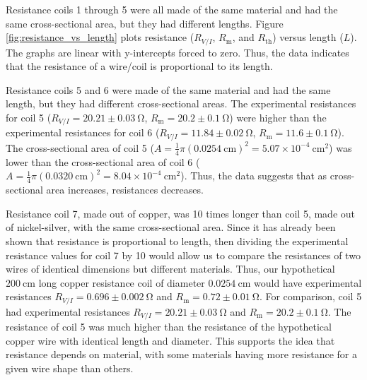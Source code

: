 \documentclass[12pt]{iopart} %
\gdef\sci#1#2{#1 \times 10^{#2}}
\gdef\units#1{~\mathrm{#1}}
\begin{document}
Resistance coils 1 through 5 were all made of the same material and had the same cross-sectional area, but they had different lengths.
Figure \ref{fig:resistance_vs_length} plots resistance ($R_{V/I}$, $R_\mathrm{m}$, and $R_\mathrm{th}$) versus length ($L$).
The graphs are linear with y-intercepts forced to zero.
Thus, the data indicates that the resistance of a wire/coil is proportional to its length.

Resistance coils 5 and 6 were made of the same material and had the same length, but they had different cross-sectional areas.
The experimental resistances for coil 5 ($R_{V/I} = 20.21 \pm 0.03 \units{\Omega}$, $R_\mathrm{m} = 20.2 \pm 0.1 \units{\Omega}$) were higher than the experimental resistances for coil 6 ($R_{V/I} = 11.84 \pm 0.02 \units{\Omega}$, $R_\mathrm{m} = 11.6 \pm 0.1 \units{\Omega}$).
The cross-sectional area of coil 5 ($A = \frac{1}{4} \pi (0.0254 \units{cm})^2 = \sci{5.07}{-4} \units{cm^2}$) was lower than the cross-sectional area of coil 6 ($A = \frac{1}{4} \pi (0.0320 \units{cm})^2 = \sci{8.04}{-4} \units{cm^2}$).
Thus, the data suggests that as cross-sectional area increases, resistances decreases.

Resistance coil 7, made out of copper, was 10 times longer than coil 5, made out of nickel-silver, with the same cross-sectional area. 
Since it has already been shown that resistance is proportional to length, then dividing the experimental resistance values for coil 7 by 10 would allow us to compare the resistances of two wires of identical dimensions but different materials.
Thus, our hypothetical $200 \units{cm}$ long copper resistance coil of diameter $0.0254 \units{cm}$ would have experimental resistances $R_{V/I} = 0.696 \pm 0.002 \units{\Omega}$ and $R_\mathrm{m} = 0.72 \pm 0.01 \units{\Omega}$.
For comparison, coil 5 had experimental resistances $R_{V/I} = 20.21 \pm 0.03 \units{\Omega}$ and $R_\mathrm{m} = 20.2 \pm 0.1 \units{\Omega}$.
The resistance of coil 5 was much higher than the resistance of the hypothetical copper wire with identical length and diameter.
This supports the idea that resistance depends on material, with some materials having more resistance for a given wire shape than others.
\end{document}
